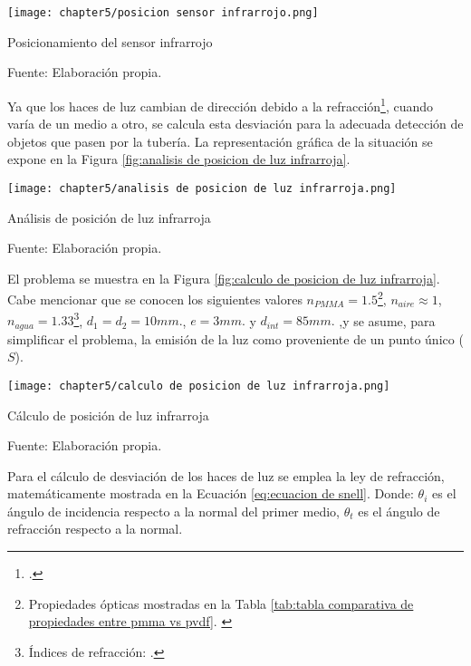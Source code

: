 \begin{myfigure}[H]
	\centering
	\texttt{[image: chapter5/posicion sensor infrarrojo.png]}
	\caption{Posicionamiento del sensor infrarrojo}
	\begin{myflushleftportland}
		Fuente: Elaboración propia.
	\end{myflushleftportland}
	\label{fig:posicion sensor infrarrojo}
\end{myfigure}

Ya que los haces de luz cambian de dirección debido a la refracción\footnote{\cite{Hecht2017}.}, cuando varía de un medio a otro, se calcula esta desviación para la adecuada detección de objetos que pasen por la tubería. La representación gráfica de la situación se expone en la Figura \ref{fig:analisis de posicion de luz infrarroja}.

\begin{myfigure}[H]
	\centering
	\texttt{[image: chapter5/analisis de posicion de luz infrarroja.png]}
	\caption{Análisis de posición de luz infrarroja}
	\begin{myflushleftportland}
		Fuente: Elaboración propia.
	\end{myflushleftportland}
	\label{fig:analisis de posicion de luz infrarroja}
\end{myfigure}

El problema se muestra en la Figura \ref{fig:calculo de posicion de luz infrarroja}. Cabe mencionar que se conocen los siguientes valores $n_{PMMA}=1.5$\footnote{Propiedades ópticas mostradas en la Tabla \ref{tab:tabla comparativa de propiedades entre pmma vs pvdf}. \cite{Berins1991}}, $n_{aire}\approx1$, $n_{agua}=1.33$\footnote{Índices de refracción: \cite{Hecht2017}.}, $d_{1}=d_{2}=10 mm.$, $e=3 mm.$ y $d_{int}=85 mm.$ ,y se asume, para simplificar el problema, la emisión de la luz como proveniente de un punto único ($S$).

\begin{myfigure}[H]
	\centering
	\texttt{[image: chapter5/calculo de posicion de luz infrarroja.png]}
	\caption{Cálculo de posición de luz infrarroja}
	\begin{myflushleftportland}
		Fuente: Elaboración propia.
	\end{myflushleftportland}
	\label{fig:calculo de posicion de luz infrarroja}
\end{myfigure}

Para el cálculo de desviación de los haces de luz se emplea la ley de refracción, matemáticamente mostrada en la Ecuación \ref{eq:ecuacion de snell}. Donde: $\theta_{i}$ es el ángulo de incidencia respecto a la normal del primer medio, $\theta_{t}$ es el ángulo de refracción respecto a la normal.

